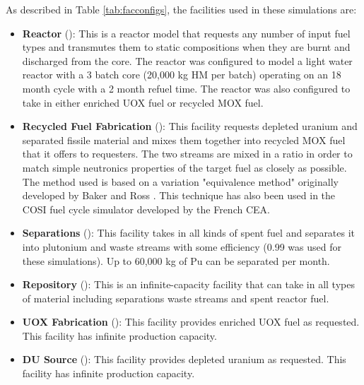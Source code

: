 As described in Table \ref{tab:facconfigs}, the facilities used in these simulations are:
\begin{itemize}

    \item \textbf{Reactor} (): This is a reactor
        model that requests any number of input fuel types and transmutes them
        to static compositions when they are burnt and discharged from the
        core. The reactor was configured to model a light water reactor
        with a 3 batch core (20,000 kg HM per batch) operating on an 18 month
        cycle with a 2 month refuel time.  The reactor was also configured to
        take in either enriched \gls{UOX} fuel or recycled \gls{MOX} fuel.

    \item \textbf{Recycled Fuel Fabrication} (): This
        facility requests depleted uranium and separated fissile material and
        mixes them together into recycled \gls{MOX} fuel that it offers to
        requesters.  The two streams are mixed in a ratio in order to match
        simple neutronics properties of the target fuel as closely as
        possible.  The method used is based on a variation "equivalence
        method" originally developed by Baker and Ross
        \cite{baker_comparison_1963}.  This technique has also been used in the
        \gls{COSI} fuel cycle simulator developed by the French \gls{CEA}.

    \item \textbf{Separations} (): This facility
        takes in all kinds of spent fuel and separates it into plutonium and
        waste streams with some efficiency (0.99 was used for these
        simulations).  Up to 60,000 kg of Pu can be separated per month.

    \item \textbf{Repository} (): This is an
        infinite-capacity facility that can take in all types of material
        including separations waste streams and spent reactor fuel.

    \item \textbf{UOX Fabrication} (): This facility
        provides enriched \gls{UOX} fuel as requested.  This facility has infinite
        production capacity.

    \item \textbf{DU Source} (): This facility
        provides depleted uranium as requested. This facility has infinite
        production capacity.

\end{itemize}

